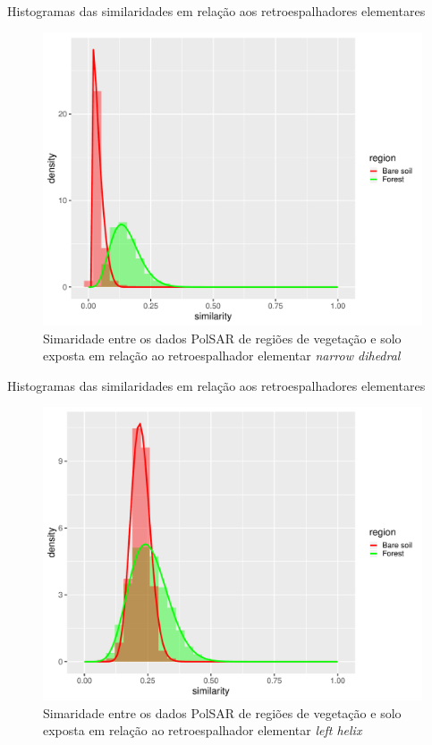 \documentclass{beamer} %
\begin{document}
\begin{frame}{Histogramas das similaridades em relação aos retroespalhadores elementares}

\begin{figure}
    \centering
    \includegraphics[width = .6\linewidth]{nd.pdf}
    \caption{Simaridade entre os dados PolSAR de regiões de vegetação e solo exposta em relação ao retroespalhador elementar \textit{narrow dihedral}}
    \label{fig:nd}
\end{figure}
    
\end{frame}

\begin{frame}{Histogramas das similaridades em relação aos retroespalhadores elementares}

\begin{figure}
    \centering
    \includegraphics[width = .6\linewidth]{lh.pdf}
    \caption{Simaridade entre os dados PolSAR de regiões de vegetação e solo exposta em relação ao retroespalhador elementar \textit{left helix}}
    \label{fig:lh}
\end{figure}
    
\end{frame}
\end{document}
